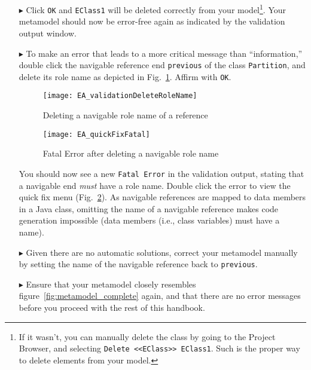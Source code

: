 \begin{enumerate}
\item[$\blacktriangleright$] Click \texttt{OK} and \texttt{EClass1} will be deleted correctly from your model\footnote{If it wasn't, you can manually delete the class by going to the Project Browser, and selecting \texttt{Delete <<EClass>> EClass1}. Such is the proper way to delete elements from your model.}.
Your metamodel should now be error-free again as indicated by the validation output window.

\item[$\blacktriangleright$] To make an error that leads to a more critical message than ``information,''
double click the navigable reference end \texttt{previous} of the class \texttt{Partition}, and delete its role name as depicted in Fig.~\ref{fig:delete-role-name}.
Affirm with \texttt{OK}.

\begin{figure}[htbp]
    \centering
  \texttt{[image: EA\_validationDeleteRoleName]}
    \caption{Deleting a navigable role name of a reference}
    \label{fig:delete-role-name}
\end{figure}


\begin{figure}[htbp]
	\centering
  \texttt{[image: EA\_quickFixFatal]}
	\caption{Fatal Error after deleting a navigable role name}
	\label{fig:fatal-error}
\end{figure}

You should now see a new \texttt{Fatal Error} in the validation output, stating that a navigable end \emph{must} have a role name. Double click the error to view the quick fix menu (Fig.~\ref{fig:fatal-error}). As navigable references are mapped to data members in a Java class, omitting the name of a navigable reference makes code generation impossible (data members (i.e., class variables) must have a name).

\item[$\blacktriangleright$] Given there are no automatic solutions, correct your metamodel manually by setting the name of the navigable reference back to \texttt{previous}.

\item[$\blacktriangleright$] Ensure that your metamodel closely resembles figure~\ref{fig:metamodel_complete} again, and that there are no error messages before you proceed with the rest of this handbook.
\end{enumerate}

